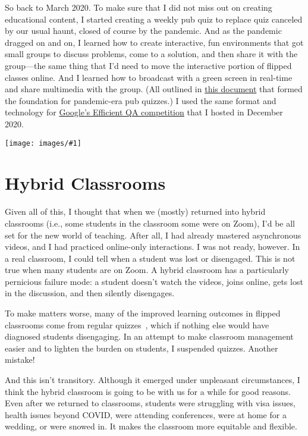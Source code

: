 \documentclass[11pt]{amsart}
\newcommand{\image}[2]{  \begin{center}
\texttt{[image: images/\#1]}
\end{center}
  }
\begin{document}
So back to March 2020. To make sure that I did not miss out on
creating educational content, I started creating a weekly pub quiz to
replace quiz canceled by our usual haunt, closed of course by the
pandemic.  And as the pandemic dragged on and on, I learned how to
create interactive, fun environments that got small groups to discuss
problems, come to a solution, and then share it with the group---the
same thing that I'd need to move the interactive portion of flipped
classes online.  And I
learned how to broadcast with a green screen in real-time and share
multimedia with the group.  (All outlined in \href{https://docs.google.com/document/d/1YesfpZ_-b2mT3BkTrlOLD5epZxz4uF1DqUkHZHrn344/edit?usp=sharing}{this document} that formed
the foundation for pandemic-era pub quizzes.)  I used the same
format and technology for \href{https://sites.google.com/view/qanta/past-events/neurips-2020-efficient-qa}{Google's Efficient QA competition} that I
hosted in December 2020.

\image{efficient_qa}{}

\section{Hybrid Classrooms}

Given all of this, I thought that when we (mostly) returned into hybrid
classrooms (i.e., some students in the classroom some were on Zoom), I'd be
all set for the new world of teaching.  After all, I had already mastered
asynchronous videos, and I had practiced online-only interactions.  I was not
ready, however.  In a real classroom, I could tell when a student was lost or
disengaged.  This is not true when many students are on Zoom.  A hybrid
classroom has a particularly pernicious failure mode: a student doesn't watch
the videos, joins online, gets lost in the discussion, and then silently
disengages.

To make matters worse, many of the improved learning outcomes in
flipped classrooms come from regular quizzes~\cite{tune-13}, which if
nothing else would have diagnosed students disengaging. In an attempt
to make classroom management easier and to lighten the burden on
students, I suspended quizzes.  Another mistake!

And this isn't transitory.  Although it emerged under unpleasant
circumstances, I think the hybrid classroom is going to be with us for
a while for good reasons.  Even after we returned to classrooms,
students were struggling with visa issues, health issues beyond COVID,
were attending conferences, were at home for a wedding, or were snowed
in.  It makes the classroom more equitable and flexible.
\end{document}
